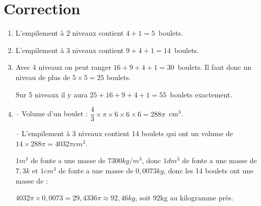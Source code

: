 \documentclass[11pt]{article}
\begin{document}
\newpage

\section*{Correction}

\begin{enumerate}
	\item L'empilement à 2 niveaux contient $4 + 1 = 5$~boulets.	
	\item L'empilement à 3 niveaux contient $9 + 4 + 1 = 14$~boulets.
	\item Avec 4 niveaux on peut ranger $16 + 9 + 4 + 1 = 30$~boulets. Il faut donc un niveau de plus de $5 \times 5 = 25$ boulets.

Sur 5 niveaux il y aura $25 + 16 + 9 + 4 + 1 = 55$~boulets exactement.
	\item -- Volume d'un boulet : $\dfrac{4}{3} \times \pi \times 6 \times 6 \times 6 = 288\pi$~cm$^3$.

-- L'empilement à 3 niveaux contient 14 boulets qui ont un volume de $14 \times 288 \pi = 4032 \pi cm^3$.

$1 m^3$ de fonte a une masse de $7300 kg/m^3$, donc $1 dm^3$ de fonte a une masse de $7,3 k$ et $1 cm^3$ de fonte a une masse de $0,0073 kg$, donc les 14 boulets ont une masse de :

$ 4032\pi \times 0,0073 = 29,4336 \pi \approx 92,46 kg$, soit 92kg au kilogramme près.
	
\end{enumerate}
 
\end{document}
